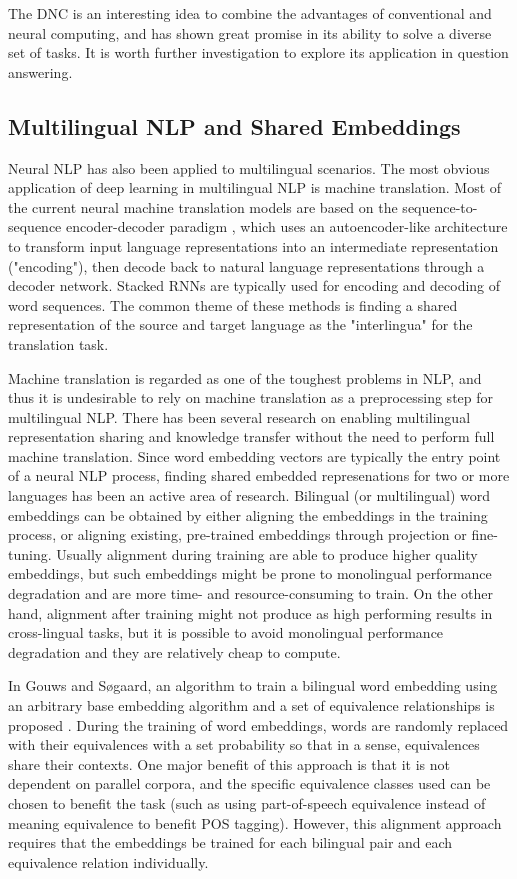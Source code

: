 \documentclass[]{article}
\begin{document}
The DNC is an interesting idea to combine the advantages of conventional and neural computing, and has shown great promise in its ability to solve a diverse set of tasks. It is worth further investigation to explore its application in question answering.

\subsection{Multilingual NLP and Shared Embeddings}

Neural NLP has also been applied to multilingual scenarios. The most obvious application of deep learning in multilingual NLP is machine translation. Most of the current neural machine translation models are based on the sequence-to-sequence encoder-decoder paradigm \cite{kalchbrenner2013recurrent, cho2014properties}, which uses an autoencoder-like architecture to transform input language representations into an intermediate representation ("encoding"), then decode back to natural language representations through a decoder network. Stacked RNNs are typically used for encoding and decoding of word sequences. The common theme of these methods is finding a shared representation of the source and target language as the "interlingua" for the translation task.

Machine translation is regarded as one of the toughest problems in NLP, and thus it is undesirable to rely on machine translation as a preprocessing step for multilingual NLP. There has been several research on enabling multilingual representation sharing and knowledge transfer without the need to perform full machine translation. Since word embedding vectors are typically the entry point of a neural NLP process, finding shared embedded represenations for two or more languages has been an active area of research. Bilingual (or multilingual) word embeddings can be obtained by either aligning the embeddings in the training process, or aligning existing, pre-trained embeddings through projection or fine-tuning. Usually alignment during training are able to produce higher quality embeddings, but such embeddings might be prone to monolingual performance degradation and are more time- and resource-consuming to train. On the other hand, alignment after training might not produce as high performing results in cross-lingual tasks, but it is possible to avoid monolingual performance degradation and they are relatively cheap to compute.

In Gouws and S{\o}gaard, an algorithm to train a bilingual word embedding using an arbitrary base embedding algorithm and a set of equivalence relationships is proposed \cite{gouws2015simple}. During the training of word embeddings, words are randomly replaced with their equivalences with a set probability so that in a sense, equivalences share their contexts. One major benefit of this approach is that it is not dependent on parallel corpora, and the specific equivalence classes used can be chosen to benefit the task (such as using part-of-speech equivalence instead of meaning equivalence to benefit POS tagging)\cite{gouws2015simple}. However, this alignment approach requires that the embeddings be trained for each bilingual pair and each equivalence relation individually.
\end{document}
